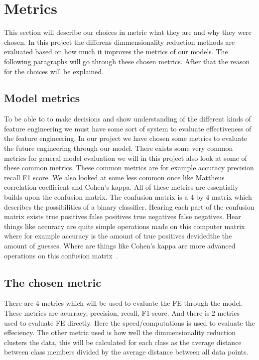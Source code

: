 \section{Metrics}
This section will describe our choices in metric what they are and why they were chosen. In this project the differens dimmensionality reduction methods are evaluated based on how much it improves the metrics of our models.
The following paragraphs will go through these chosen metrics. After that the reason for the choices will be explained.

\subsection*{Model metrics}
To be able to to make decisions and show understanding of the different kinds of feature engineering we must have some sort of system to evaluate effectiveness of the  feature engineering. In our project we have chosen some metrics to evaluate the future engineering through our model. There exists some very common metrics for general model evaluation we will in this project also look at some of these common metrics. These common metrics are for example accuracy precision recall F1 score. We also looked at some less common once like Mattheus correlation coefficient and Cohen's kappa. All of these metrics are essentially builds upon the confusion matrix. The confusion matrix is a 4 by 4 matrix which describes the possibilities of a binary classifier. Hearing each part of the confusion matrix exists true positives false positives true negatives false negatives. Hear things like accuracy are quite simple operations made on this computer matrix where for example accuracy is the amount of true positives devidedthe the amount of guesses. Where are things like Cohen's kappa are more advanced operations on this confusion matrix~\cite{metrics-for-multi}.

\subsection{The chosen metric}
There are 4 metrics which will be used to evaluate the FE through the model. These metrics are acurracy, precision, recall, F1-score. And there is 2 metrics used to evaluate FE directly. Here the speed/computations is used to evaluate the effeciency. The other metric used is how well the dimmensionality reduction clusters the data, this will be calculated for each class as the average distance between class members divided by the average distance between all data points.


